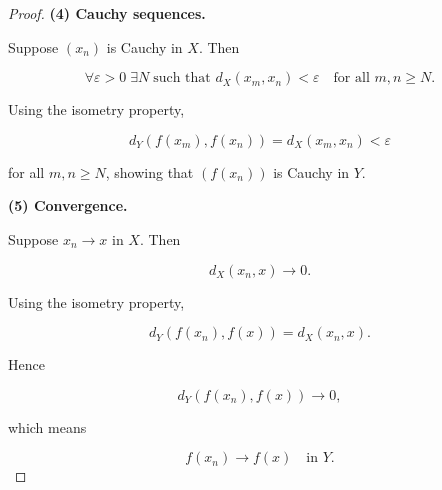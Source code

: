 \begin{proof}
\textbf{(4) Cauchy sequences.}

Suppose $(x_n)$ is Cauchy in $X$. Then

\[
\forall \varepsilon>0\;\exists N\;
\text{such that }
d_X(x_m,x_n)<\varepsilon
\quad
\text{for all } m,n\ge N.
\]

Using the isometry property,

\[
d_Y(f(x_m),f(x_n))
=
d_X(x_m,x_n)
<
\varepsilon
\]

for all $m,n\ge N$, showing that $(f(x_n))$ is Cauchy in $Y$.

\medskip

\textbf{(5) Convergence.}

Suppose $x_n\to x$ in $X$. Then

\[
d_X(x_n,x)\to 0.
\]

Using the isometry property,

\[
d_Y(f(x_n),f(x))
=
d_X(x_n,x).
\]

Hence

\[
d_Y(f(x_n),f(x))\to 0,
\]

which means

\[
f(x_n)\to f(x)
\quad
\text{in } Y.
\]

\end{proof}

